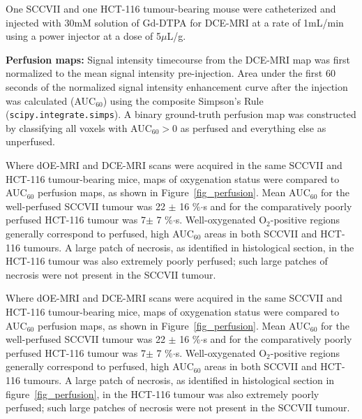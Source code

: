 One SCCVII and one HCT-116 tumour-bearing mouse were catheterized and injected with 30mM solution of Gd-DTPA for \acs{DCE-MRI} at a rate of 1mL/min using a power injector at a dose of 5$\mu$L/g.

\noindent\textbf{Perfusion maps:} Signal intensity timecourse from the DCE-MRI map was first normalized to the mean signal intensity pre-injection.
Area under the first 60 seconds of the normalized signal intensity enhancement curve after the injection was calculated (\acs{AUC}$_{60}$) using the composite Simpson's Rule (\texttt{scipy.integrate.simps}).
A binary ground-truth perfusion map was constructed by classifying all voxels with AUC$_{60} > 0$ as perfused and everything else as unperfused.

Where \ac{dOE-MRI} and DCE-MRI scans were acquired in the same SCCVII and HCT-116 tumour-bearing mice,  maps of oxygenation status were compared to \acs{AUC}$_{60}$ perfusion maps, as shown in Figure~\ref{fig_perfusion}.
Mean \acs{AUC}$_{60}$ for the well-perfused SCCVII tumour was 22 $\pm$ 16 \%$\cdot$s and for the comparatively poorly perfused HCT-116 tumour was 7$\pm$ 7 \%$\cdot$s.
Well-oxygenated O$_2$-positive regions generally correspond to perfused, high \acs{AUC}$_{60}$ areas in both SCCVII and HCT-116 tumours.
A large patch of necrosis, as identified in histological section, in the HCT-116 tumour was also extremely poorly perfused; such large patches of necrosis were not present in the SCCVII tumour.

Where \acs{dOE-MRI} and \acs{DCE-MRI} scans were acquired in the same SCCVII and HCT-116 tumour-bearing mice,  maps of oxygenation status were compared to \acs{AUC}$_{60}$ perfusion maps, as shown in Figure~\ref{fig_perfusion}.
Mean \acs{AUC}$_{60}$ for the well-perfused SCCVII tumour was 22 $\pm$ 16 \%$\cdot$s and for the comparatively poorly perfused HCT-116 tumour was 7$\pm$ 7 \%$\cdot$s.
Well-oxygenated O$_2$-positive regions generally correspond to perfused, high \acs{AUC}$_{60}$ areas in both SCCVII and HCT-116 tumours.
A large patch of necrosis, as identified in histological section in figure~\ref{fig_perfusion}, in the HCT-116 tumour was also extremely poorly perfused; such large patches of necrosis were not present in the SCCVII tumour.

